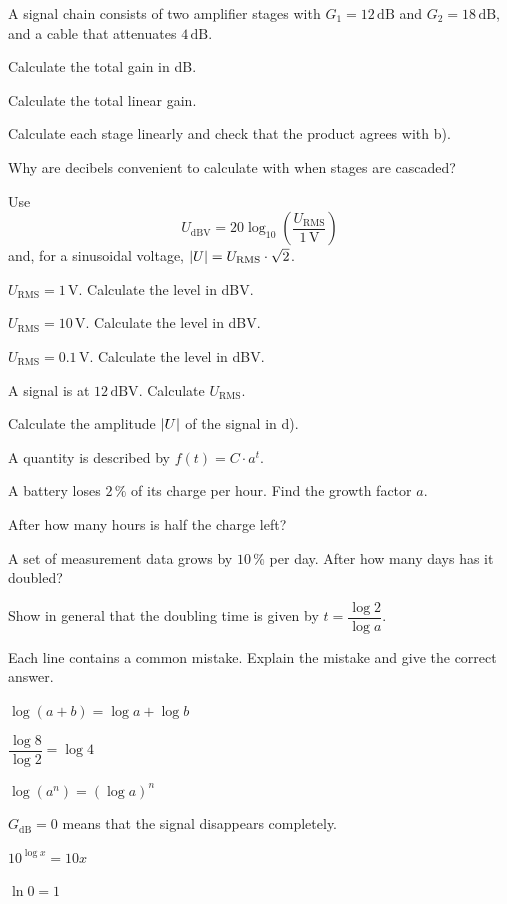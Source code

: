 A signal chain consists of two amplifier stages with $G_1 = 12\,\text{dB}$ and
$G_2 = 18\,\text{dB}$, and a cable that attenuates $4\,\text{dB}$.
\begin{parts}
  \item Calculate the total gain in dB.
  \item Calculate the total linear gain.
  \item Calculate each stage linearly and check that the product agrees with b).
  \item Why are decibels convenient to calculate with when stages are cascaded?
\end{parts}

Use
\[
  U_{\text{dBV}} = 20\log_{10}\left(\frac{U_{\text{RMS}}}{1\,\text{V}}\right)
\]
and, for a sinusoidal voltage, $\lvert U\rvert = U_{\text{RMS}} \cdot \sqrt{2}$.
\begin{parts}
  \item $U_{\text{RMS}} = 1\,\text{V}$. Calculate the level in dBV.
  \item $U_{\text{RMS}} = 10\,\text{V}$. Calculate the level in dBV.
  \item $U_{\text{RMS}} = 0.1\,\text{V}$. Calculate the level in dBV.
  \item A signal is at $12\,\text{dBV}$. Calculate $U_{\text{RMS}}$.
  \item Calculate the amplitude $\lvert U\rvert$ of the signal in d).
\end{parts}

A quantity is described by $f(t) = C \cdot a^t$.
\begin{parts}
  \item A battery loses $2\,\%$ of its charge per hour. Find the growth factor $a$.
  \item After how many hours is half the charge left?
  \item A set of measurement data grows by $10\,\%$ per day. After how many days has it doubled?
  \item Show in general that the doubling time is given by $t = \dfrac{\log 2}{\log a}$.
\end{parts}

Each line contains a common mistake. Explain the mistake and give the correct answer.
\begin{parts}
  \item $\log(a + b) = \log a + \log b$
  \item $\dfrac{\log 8}{\log 2} = \log 4$
  \item $\log(a^n) = (\log a)^n$
  \item $G_{\text{dB}} = 0$ means that the signal disappears completely.
  \item $10^{\log x} = 10x$
  \item $\ln 0 = 1$
\end{parts}

